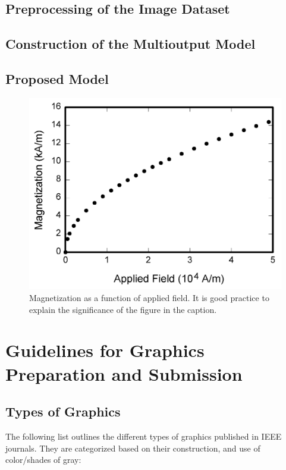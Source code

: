 \documentclass[journal,twoside,web]{ieeecolor}
\begin{document}
\subsection{Preprocessing of the Image Dataset}

\subsection{Construction of the Multioutput Model}

\subsection{Proposed Model}

\begin{figure}[!t]
\centerline{\includegraphics[width=\columnwidth]{fig1.png}}
\caption{Magnetization as a function of applied field.
It is good practice to explain the significance of the figure in the caption.}
\label{fig1}
\end{figure}

\section{Guidelines for Graphics Preparation and Submission}
\label{sec:guidelines}

\subsection{Types of Graphics}
The following list outlines the different types of graphics published in 
IEEE journals. They are categorized based on their construction, and use of 
color/shades of gray:
\end{document}
